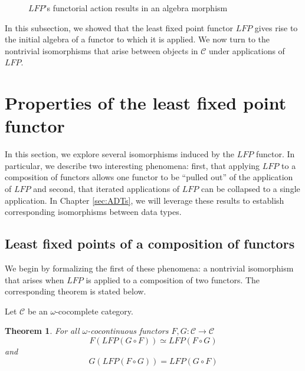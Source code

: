 \documentclass{msthesis}
\newtheorem{theorem}{Theorem}[section]
\theoremstyle{definition}
\newcommand{\mcC}{\mathcal{C}}
\begin{document}
\begin{figure}[htbp]
        \caption{$LFP$'s functorial action results in an algebra morphism}
        \label{fig:lfpalgmorphism}
\end{figure}

In this subsection, we showed that the least fixed point functor $LFP$ gives rise to the initial algebra of a functor to which it is applied. We now turn to the nontrivial isomorphisms that arise between objects in $\mcC$ under applications of $LFP$.

\section{Properties of the least fixed point functor}

In this section, we explore several isomorphisms induced by the $LFP$ functor.  In particular, we describe two interesting phenomena: first, that applying $LFP$ to a composition of functors allows one functor to be ``pulled out'' of the application of $LFP$ and second, that iterated applications of $LFP$ can be collapsed to a single application.  In Chapter \ref{sec:ADTs}, we will leverage these results to establish corresponding isomorphisms between data types.

\subsection{Least fixed points of a composition of functors}

We begin by formalizing the first of these phenomena: a nontrivial isomorphism that arises when $LFP$ is applied to a composition of two functors. The corresponding theorem is stated below.

Let $\mcC$ be an $\omega$-cocomplete category.

\begin{theorem}\label{theorem:FGcolimit}
    For all $\omega$-cocontinuous functors $F, G : \mcC \to \mcC$
    \[ F(LFP(G\circ F)) \simeq LFP(F \circ G) \]
    and
    \[ G(LFP(F \circ G)) = LFP(G \circ F)\]
\end{theorem}
\end{document}
